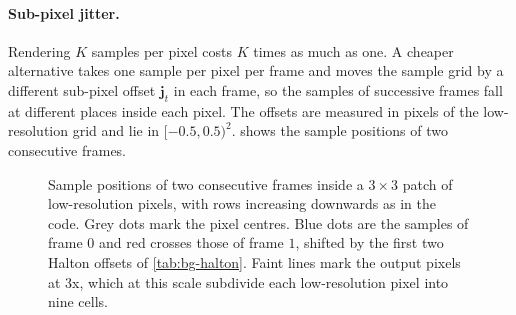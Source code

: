 \paragraph{Sub-pixel jitter.} Rendering $K$ samples per pixel costs $K$ times as much as one. A cheaper alternative takes one sample per pixel per frame and moves the sample grid by a different sub-pixel offset $\mathbf j_t$ in each frame, so the samples of successive frames fall at different places inside each pixel. The offsets are measured in pixels of the low-resolution grid and lie in $[-0.5,0.5)^2$.  shows the sample positions of two consecutive frames.

\begin{figure}[!htbp]
\centering
{}
\caption{Sample positions of two consecutive frames inside a $3\times3$ patch of low-resolution pixels, with rows increasing downwards as in the code. Grey dots mark the pixel centres. Blue dots are the samples of frame $0$ and red crosses those of frame $1$, shifted by the first two Halton offsets of \cref{tab:bg-halton}. Faint lines mark the output pixels at 3x, which at this scale subdivide each low-resolution pixel into nine cells.}\label{fig:bg-jitter}
\end{figure}

